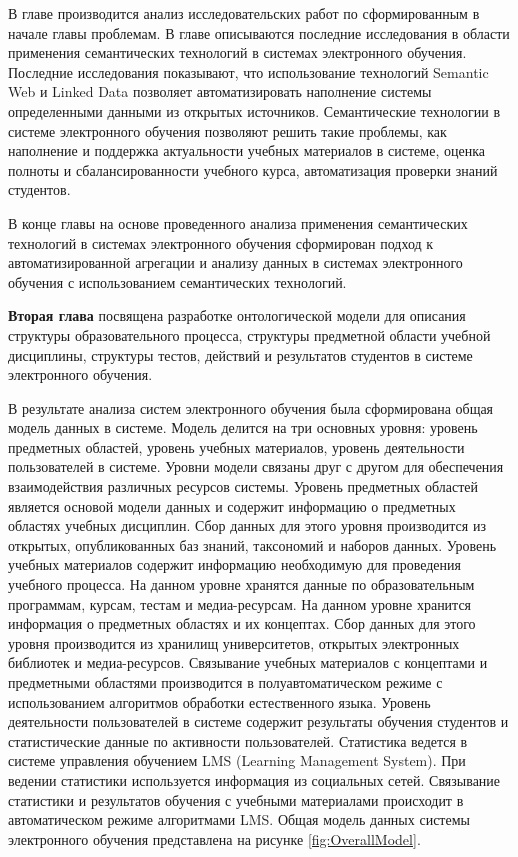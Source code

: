 В главе производится анализ исследовательских работ по сформированным в начале главы проблемам. В главе описываются последние исследования в области применения семантических технологий в системах электронного обучения. Последние исследования показывают, что использование технологий Semantic Web и Linked Data позволяет автоматизировать наполнение системы определенными данными из открытых источников. Семантические технологии в системе электронного обучения позволяют решить такие проблемы, как наполнение и поддержка актуальности учебных материалов в системе, оценка полноты и сбалансированности учебного курса, автоматизация проверки знаний студентов.

В конце главы на основе проведенного анализа применения семантических технологий в системах электронного обучения сформирован подход к автоматизированной агрегации и анализу данных в системах электронного обучения с использованием семантических технологий. 

\textbf{Вторая глава} посвящена разработке онтологической модели для описания структуры образовательного процесса, структуры предметной области учебной дисциплины, структуры тестов, действий и результатов студентов в системе электронного обучения.

В результате анализа систем электронного обучения была сформирована общая модель данных в системе. Модель делится на три основных уровня: уровень предметных областей, уровень учебных материалов, уровень деятельности пользователей в системе. Уровни модели связаны друг с другом для обеспечения взаимодействия различных ресурсов системы. Уровень предметных областей является основой модели данных и содержит информацию о предметных областях учебных дисциплин. Сбор данных для этого уровня производится из открытых, опубликованных баз знаний, таксономий и наборов данных. Уровень учебных материалов содержит информацию необходимую для проведения учебного процесса. На данном уровне хранятся данные по образовательным программам, курсам, тестам и медиа-ресурсам. На данном уровне хранится информация о предметных областях и их концептах. Сбор данных для этого уровня производится из хранилищ университетов, открытых электронных библиотек и медиа-ресурсов. Связывание учебных материалов с концептами и предметными областями производится в полуавтоматическом режиме с использованием алгоритмов обработки естественного языка. Уровень деятельности пользователей в системе содержит результаты обучения студентов и  статистические данные по активности пользователей. Статистика ведется в системе управления обучением LMS (Learning Management System). При ведении статистики используется информация из социальных сетей. Связывание статистики и результатов обучения с учебными материалами происходит в автоматическом режиме алгоритмами LMS. Общая модель данных системы электронного обучения представлена на рисунке \ref{fig:OverallModel}. 

